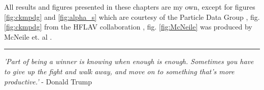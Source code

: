 \begin{titlepage}
\begin{vcenterpage}
All results and figures presented in these chapters are my own, except for figures \ref{fig:ckmpdg} and \ref{fig:alpha_s} which are courtesy of the Particle Data Group \cite{PhysRevD.98.030001}, fig. \ref{fig:ckmpdg} from the HFLAV collaboration \cite{HFLAV16}, fig. \ref{fig:McNeile} was produced by McNeile et. al \cite{McNeile:2012qf} .
    
\noindent\rule[2pt]{\textwidth}{0.5pt}
\end{vcenterpage}

\cleardoublepage

\thispagestyle{empty}

\begin{center}
  \emph{'Part of being a winner is knowing when enough is enough. Sometimes you have to give up the fight and walk away, and move on to something that's more productive.'} - Donald Trump
\end{center}

{}


\end{titlepage}
\sloppy

\titlepage

